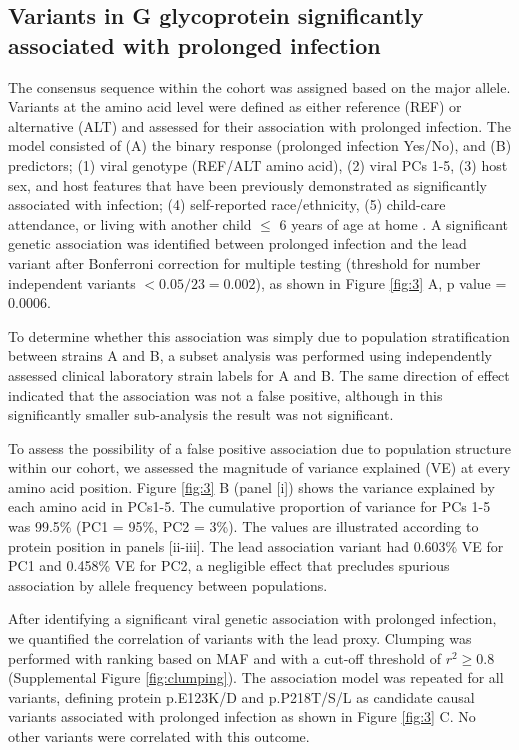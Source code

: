 \documentclass{article} %
\begin{document}
\subsection{Variants in G glycoprotein significantly associated with prolonged infection}
The consensus sequence within the cohort was assigned based on the major allele. Variants at the amino acid level were defined as either reference (REF) or alternative (ALT) and assessed for their association with prolonged infection. 
The model consisted of 
(A) the binary response (prolonged infection Yes/No), and 
(B) predictors; 
(1) viral genotype (REF/ALT amino acid), 
(2) viral PCs 1-5, 
(3) host sex, 
and host features that have been previously demonstrated as significantly associated with infection; 
(4) self-reported race/ethnicity, 
(5) child-care attendance, or living with another child $\le$ 6 years of age at home 
\citep{hall1976respiratory}. 
A significant genetic association was identified between prolonged infection and the lead variant after Bonferroni correction for multiple testing (threshold for number independent variants $< 0.05/23 = 0.002$), as shown in Figure \ref{fig:3} A, p value = 0.0006.

To determine whether this association was simply due to population stratification between strains A and B, a subset analysis was performed using independently assessed clinical laboratory strain labels for A and B. 
The same direction of effect indicated that the association was not a false positive, although in this significantly smaller sub-analysis the result was not significant. 
 
To assess the possibility of a false positive association due to population structure within our cohort, we assessed the magnitude of variance explained (VE) at every amino acid position. 
Figure \ref{fig:3} B (panel [i]) shows the variance explained by each amino acid in PCs1-5. 
The cumulative proportion of variance for PCs 1-5 was 99.5\% (PC1 = 95\%, PC2 = 3\%). 
The values are illustrated according to protein position in panels [ii-iii]. 
The lead association variant had 0.603\% VE for PC1 and 0.458\% VE for PC2, a negligible effect that precludes spurious association by allele frequency between populations.

After identifying a significant viral genetic association with prolonged infection, we quantified the correlation of variants with the lead proxy. 
Clumping was performed with ranking based on MAF and with a cut-off threshold of $r^2 \ge 0.8$ (Supplemental Figure \ref{fig:clumping}). 
The association model was repeated for all variants, defining protein p.E123K/D and p.P218T/S/L as candidate causal variants associated with prolonged infection as shown in Figure \ref{fig:3} C. 
No other variants were correlated with this outcome.
\end{document}
